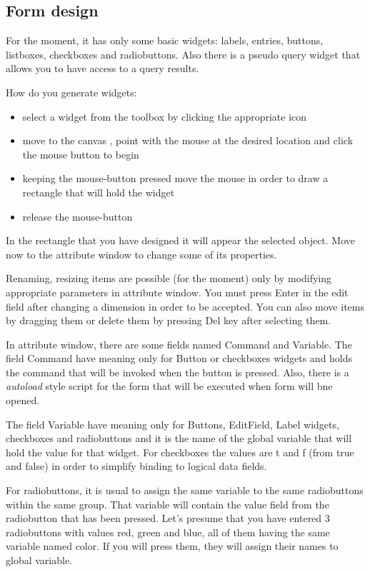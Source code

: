 \subsection{Form design}
For the moment, it has only some basic widgets:
labels, entries, buttons, listboxes, checkboxes and radiobuttons.
Also there is a pseudo query widget that allows you
to have access to a query results. 

How do you generate widgets:
\begin{itemize}
    \item select a widget from the toolbox by clicking the appropriate icon
    \item move to the canvas , point with the mouse at the desired location and click the mouse button to begin 
    \item keeping the mouse-button pressed move the mouse in order to draw a rectangle that will hold the widget 
    \item release the mouse-button 
\end{itemize}

In the rectangle that you have designed it will appear the selected object. 
Move now to the attribute window to change some of its properties.

Renaming, resizing items are possible (for the moment) only by modifying 
appropriate parameters in attribute window. You must press Enter in the 
edit field after changing a dimension in order to be accepted.
You can also move items by dragging them or delete them by pressing 
Del key after selecting them.

In attribute window, there are some fields named Command and Variable. 
The field Command have meaning only for Button or checkboxes widgets and 
holds the command that will be invoked when the button is pressed. Also, 
there is a \emph{autoload} style script for the form that will be executed 
when form will bne opened.

The field Variable have meaning only for Buttons, EditField, Label widgets,
checkboxes and radiobuttons and it is the name of the global variable that 
will hold the value for that widget. For checkboxes the values are t and f 
(from true and false) in order to simplify binding to logical data fields. 

For radiobuttons, it is usual to assign the same variable to the same 
radiobuttons within the same group. That variable will contain the value 
field from the radiobutton that has been pressed. Let's presume that you 
have entered 3 radiobuttons with values red, green and blue, all of them 
having the same variable named color. If you will press them, they will 
assign their names to global variable. 

